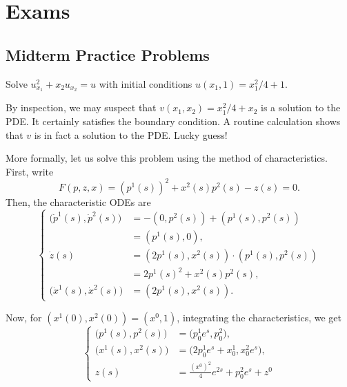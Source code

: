 \section{Exams}
\subsection{Midterm Practice Problems}
\begin{problem}
  Solve \(u_{x_1}^2+x_2u_{x_2}=u\) with initial conditions
  \(u(x_1,1)=x_1^2/4+1\).
\end{problem}
\begin{solution*}
  By inspection, we may suspect that \(v(x_1,x_2)=x_1^2/4+x_2\) is a
  solution to the PDE. It certainly satisfies the boundary condition. A
  routine calculation shows that \(v\) is in fact a solution to the
  PDE. Lucky guess!

  More formally, let us solve this problem using the method of
  characteristics. First, write
  \[
    F(p,z,x)={(p^1(s))}^2+x^2(s)p^2(s)-z(s)=0.
  \]
  Then, the characteristic ODEs are
  \[
    \left\{
      \begin{aligned}
        \bigl(\dot p^1(s),\dot p^2(s)\bigr)
        &=-(0,p^2(s))+(p^1(s),p^2(s))\\
        &=(p^1(s),0),\\
        \dot z(s)
        &=(2p^1(s),x^2(s))\cdot (p^1(s),p^2(s))\\
        &=2p^1(s)^2+x^2(s)p^2(s),\\
        \bigl(\dot x^1(s),\dot x^2(s)\bigr)&=(2p^1(s),x^2(s)).
      \end{aligned}
    \right.
  \]

  Now, for \((x^1(0),x^2(0))=(x^0,1)\), integrating the characteristics, we
  get
  \[
    \left\{
      \begin{aligned}
        \bigl(p^1(s),p^2(s)\bigr)&=\bigl(p_0^1e^s,p^2_0\bigr),\\
        \bigl(x^1(s),x^2(s)\bigr)
        &=\bigl(2p_0^1e^s+x_0^1,x_0^2e^s\bigr),\\
        z(s)&=\frac{{(x^0)}^2}{4}e^{2s}+p_0^2e^s+z^0
      \end{aligned}
    \right.
  \]


\end{solution*}
